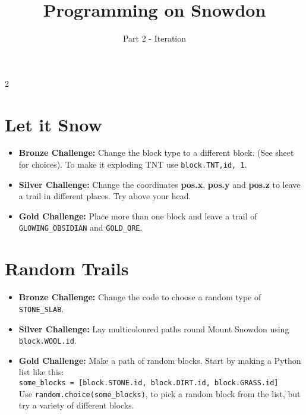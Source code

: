 \documentclass{geocraft-worksheet}
\begin{document}
\title{Programming on Snowdon}
\subtitle{Part 2 - Iteration}

\maketitle


\setcounter {section} {2}


\section{Let it Snow}
\lstset{language=Python}

\noindent%
%
\vspace{0.2cm}
%
%

\begin{itemize}
\item\textbf{Bronze Challenge:} Change the block type to a different block. (See sheet for choices). To make it
  exploding TNT use \lstinline{block.TNT,id, 1}.  
\item\textbf{Silver Challenge:} Change the coordinates \textbf{pos.x}, \textbf{pos.y} and \textbf{pos.z} to leave a
  trail in different places. Try above your head.  
\item\textbf{Gold Challenge:} Place more than one block and leave a trail of \lstinline{GLOWING_OBSIDIAN} and
  \lstinline{GOLD_ORE}. 
\end{itemize}

\section{Random Trails}

\noindent%
%
\vspace{0.2cm}
%
%

\begin{itemize}
\item\textbf{Bronze Challenge:} Change the code to choose a random type of \lstinline{STONE_SLAB}.
\item\textbf{Silver Challenge:} Lay multicoloured paths round Mount Snowdon using \lstinline{block.WOOL.id}.
\item\textbf{Gold Challenge:} Make a path of random blocks. Start by making a Python list like this: \\ \vspace{0.5cm}
\lstinline{some_blocks = [block.STONE.id, block.DIRT.id, block.GRASS.id]}  \\ \vspace{0.5cm}
Use \lstinline{random.choice(some_blocks)}, to pick a random block from the list, but try a variety of different blocks. 
\end{itemize}
\end{document}
